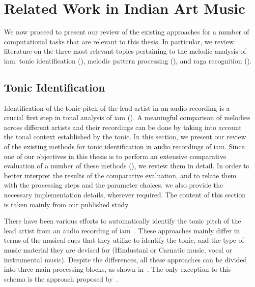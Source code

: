 \section{Related Work in Indian Art Music}
\label{sec:background_relevant_work_iam}

We now proceed to present our review of the existing approaches for a number of computational tasks that are relevant to this thesis. In particular, we review literature on the three most relevant topics pertaining to the melodic analysis of \gls{iam}: tonic identification (), melodic pattern processing (), and \gls{raga} recognition (). 


\subsection{Tonic Identification}
\label{sec:background_relevant_work_tonic_identification}

Identification of the tonic pitch of the lead artist in an audio recording is a crucial first step in tonal analysis of \gls{iam} (). A meaningful comparison of melodies across different artists and their recordings can be done by taking into account the tonal context established by the tonic. In this section, we present our review of the existing methods for tonic identification in audio recordings of \gls{iam}. Since one of our objectives in this thesis is to perform an extensive comparative evaluation of a number of these methods (), we review them in detail. In order to better interpret the results of the comparative evaluation, and to relate them with the processing steps and the parameter choices, we also provide the necessary implementation details, wherever required. The content of this section is taken mainly from our published study~\citep{Gulati2014Tonic}.

There have been various efforts to automatically identify the tonic pitch of the lead artist from an audio recording of \gls{iam}~\citep{salamon2012multipitch,gulati2012two,bellur2012knowledge,ranjani2011carnatic,Sengupta2005b,chordia2013joint}. These approaches mainly differ in terms of the musical cues that they utilize to identify the tonic, and the type of music material they are devised for (Hindustani or Carnatic music, vocal or
instrumental music). Despite the differences, all these approaches can be divided into three main processing blocks, as shown in~. The only exception to this schema is the approach proposed by~\cite{Sengupta2005b}. 

